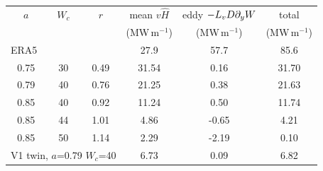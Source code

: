 {\small
\begin{tabular}{cccccc}
\toprule
$a$ & $W_c$ & $r$ & mean $v\hat H$ & eddy $-L_vD\partial_y W$ & total\\
 & & & (MW\,m$^{-1}$) & (MW\,m$^{-1}$) & (MW\,m$^{-1}$)\\
\midrule
\multicolumn{3}{l}{ERA5} & 27.9 & 57.7 & 85.6\\
\midrule
0.75 & 30 & 0.49 & 31.54 & 0.16 & 31.70\\
0.79 & 40 & 0.76 & 21.25 & 0.38 & 21.63\\
0.85 & 40 & 0.92 & 11.24 & 0.50 & 11.74\\
0.85 & 44 & 1.01 & 4.86 & -0.65 & 4.21\\
0.85 & 50 & 1.14 & 2.29 & -2.19 & 0.10\\
\multicolumn{3}{l}{V1 twin, $a$=0.79 $W_c$=40} & 6.73 & 0.09 & 6.82\\
\bottomrule
\end{tabular}
}
